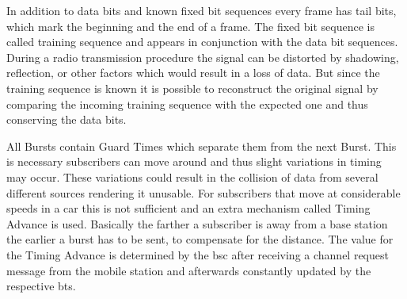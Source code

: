 In addition to data bits and known fixed bit sequences every frame has tail bits, which mark the beginning and the end of a frame.
The fixed bit sequence is called training sequence and appears in conjunction with the data bit sequences.
During a radio transmission procedure the signal can be distorted by shadowing, reflection, or other factors which would result in a loss of data.
But since the training sequence is known it is possible to reconstruct the original signal by comparing the incoming training sequence with the expected one and thus conserving the data bits.

All Bursts contain Guard Times which separate them from the next Burst.
This is necessary subscribers can move around and thus slight variations in timing may occur.
These variations could result in the collision of data from several different sources rendering it unusable.
For subscribers that move at considerable speeds \eg in a car this is not sufficient and an extra mechanism called Timing Advance is used.
Basically the farther a subscriber is away from a base station the earlier a burst has to be sent, to compensate for the distance.
The value for the Timing Advance is determined by the \gls{bsc} after receiving a channel request message from the mobile station and afterwards constantly updated by the respective \gls{bts}.

